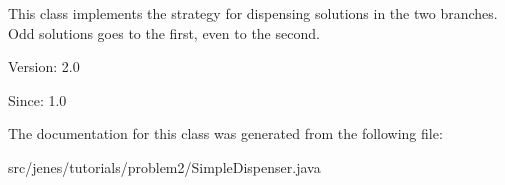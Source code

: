 This class implements the strategy for dispensing solutions in the two branches. Odd solutions goes to the first, even to the second.

\begin{Desc}
\item[Version:]2.0 \end{Desc}
\begin{Desc}
\item[Since:]1.0 \end{Desc}


The documentation for this class was generated from the following file:\begin{CompactItemize}
\item 
src/jenes/tutorials/problem2/SimpleDispenser.java\end{CompactItemize}
